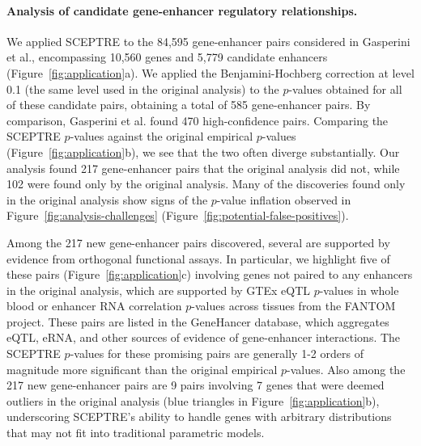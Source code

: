\documentclass{nature}
\begin{document}
\paragraph{Analysis of candidate gene-enhancer regulatory relationships.}

We applied SCEPTRE to the 84,595 gene-enhancer pairs considered in Gasperini et al., encompassing 10,560 genes and 5,779 candidate enhancers (Figure~\ref{fig:application}a). We applied the Benjamini-Hochberg correction at level 0.1 (the same level used in the original analysis) to the $p$-values obtained for all of these candidate pairs, obtaining a total of 585 gene-enhancer pairs. By comparison, Gasperini et al. found 470 high-confidence pairs. Comparing the SCEPTRE $p$-values against the original empirical $p$-values (Figure~\ref{fig:application}b), we see that the two often diverge substantially. Our analysis found 217 gene-enhancer pairs that the original analysis did not, while 102 were found only by the original analysis. Many of the discoveries found only in the original analysis show signs of the $p$-value inflation observed in Figure~\ref{fig:analysis-challenges} (Figure~\ref{fig:potential-false-positives}). 

Among the 217 new gene-enhancer pairs discovered, several are supported by evidence from orthogonal functional assays. In particular, we highlight five of these pairs (Figure~\ref{fig:application}c) involving genes not paired to any enhancers in the original analysis, which are supported by GTEx\cite{GTExPilot} eQTL $p$-values in whole blood or enhancer RNA correlation $p$-values across tissues from the FANTOM project\cite{Andersson2014}. These pairs are listed in the GeneHancer database\cite{Fishilevich2017}, which aggregates eQTL, eRNA, and other sources of evidence of gene-enhancer interactions. The SCEPTRE $p$-values for these promising pairs are generally 1-2 orders of magnitude more significant than the original empirical $p$-values. Also among the 217 new gene-enhancer pairs are 9 pairs involving 7 genes that were deemed outliers in the original analysis (blue triangles in Figure~\ref{fig:application}b), underscoring SCEPTRE's ability to handle genes with arbitrary distributions that may not fit into traditional parametric models. 
\end{document}

